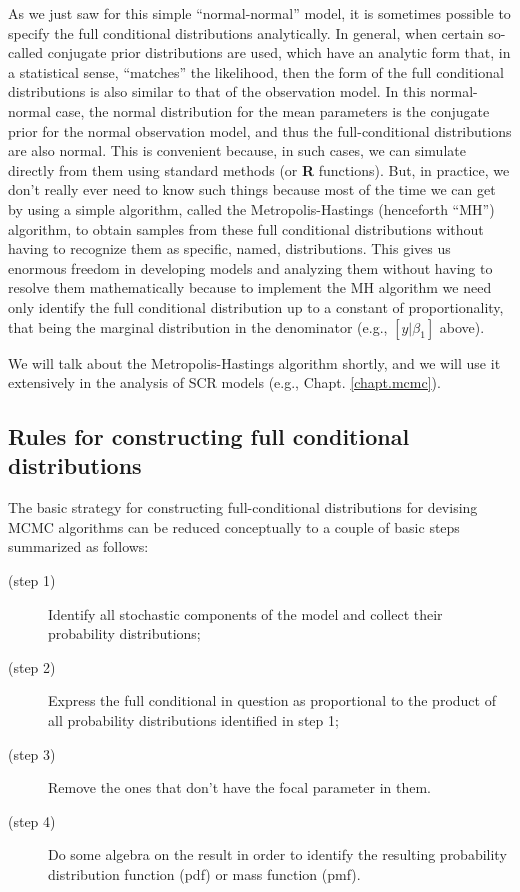 \vspace{.1in}

As we just saw for this simple ``normal-normal'' model, it is sometimes
possible to specify the full conditional distributions
analytically. In general, when certain so-called conjugate prior
distributions are used, which have an analytic form that, in a
statistical
sense, ``matches'' the likelihood, then the form of the full conditional distributions
is also similar to that of the observation model. In this normal-normal
case, the normal distribution for the mean parameters is the conjugate
prior for the normal observation model, and thus the full-conditional
distributions are also normal. This is convenient because, in such
cases, we can simulate directly from them using standard methods (or
{\bf R}
functions).  But, in practice, we don't really ever need to know such
things because most of the time we can get by using a simple
algorithm, called the Metropolis-Hastings (henceforth ``MH'')
algorithm, to obtain samples from these full conditional distributions
without having to recognize them as specific, named, distributions.
This gives us enormous freedom in developing models
and analyzing them without having to resolve them mathematically
because to implement the MH algorithm we need only identify the full
conditional distribution up to a constant of proportionality, that
being the marginal distribution in the denominator (e.g., $[y|\beta_1]$
above).

We will talk about the Metropolis-Hastings algorithm shortly, and we
will use it extensively in the analysis of SCR models (e.g., Chapt.
\ref{chapt.mcmc}).

\subsection{Rules for constructing full conditional distributions}
\label{glms.sec.rules}

The basic strategy for constructing full-conditional distributions for
devising MCMC algorithms can be reduced conceptually to a couple of
basic steps summarized as follows:

\begin{description}
\item[   (step 1)] Identify all stochastic components of the model and
  collect their probability distributions;
\item[   (step 2)] Express the full conditional in question
  as proportional to the product of all probability distributions
  identified in step 1;
\item[   (step 3)] Remove the ones that don't have the focal parameter in them.
\item[   (step 4)] Do some algebra on the result in order to identify
  the resulting probability distribution function (pdf) or mass
  function (pmf).
\end{description}

